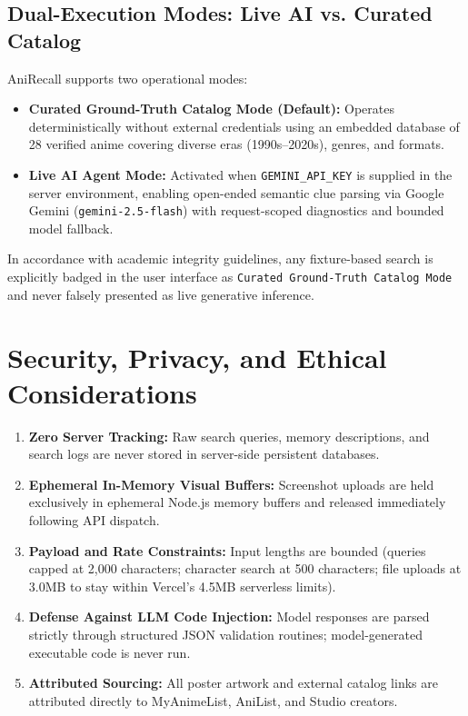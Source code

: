 \documentclass[11pt,a4paper]{article}
\begin{document}
\subsection{Dual-Execution Modes: Live AI vs. Curated Catalog}
AniRecall supports two operational modes:
\begin{itemize}[noitemsep]
    \item \textbf{Curated Ground-Truth Catalog Mode (Default):} Operates deterministically without external credentials using an embedded database of 28 verified anime covering diverse eras (1990s--2020s), genres, and formats.
    \item \textbf{Live AI Agent Mode:} Activated when \texttt{GEMINI\_API\_KEY} is supplied in the server environment, enabling open-ended semantic clue parsing via Google Gemini (\texttt{gemini-2.5-flash}) with request-scoped diagnostics and bounded model fallback.
\end{itemize}
In accordance with academic integrity guidelines, any fixture-based search is explicitly badged in the user interface as \texttt{Curated Ground-Truth Catalog Mode} and never falsely presented as live generative inference.

\section{Security, Privacy, and Ethical Considerations}
\label{sec:security}

\begin{enumerate}[noitemsep]
    \item \textbf{Zero Server Tracking:} Raw search queries, memory descriptions, and search logs are never stored in server-side persistent databases.
    \item \textbf{Ephemeral In-Memory Visual Buffers:} Screenshot uploads are held exclusively in ephemeral Node.js memory buffers and released immediately following API dispatch.
    \item \textbf{Payload and Rate Constraints:} Input lengths are bounded (queries capped at 2,000 characters; character search at 500 characters; file uploads at 3.0MB to stay within Vercel's 4.5MB serverless limits).
    \item \textbf{Defense Against LLM Code Injection:} Model responses are parsed strictly through structured JSON validation routines; model-generated executable code is never run.
    \item \textbf{Attributed Sourcing:} All poster artwork and external catalog links are attributed directly to MyAnimeList, AniList, and Studio creators.
\end{enumerate}
\end{document}
